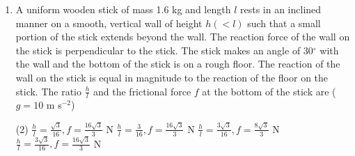
\begin{enumerate}
    \item A uniform wooden stick of mass 1.6 kg and length \( l \) rests in an inclined manner on a smooth, vertical wall of height \( h (< l) \) such that a small portion of the stick extends beyond the wall. The reaction force of the wall on the stick is perpendicular to the stick. The stick makes an angle of 30\(^{\circ}\) with the wall and the bottom of the stick is on a rough floor. The reaction of the wall on the stick is equal in magnitude to the reaction of the floor on the stick. The ratio \( \frac{h}{l} \) and the frictional force \( f \) at the bottom of the stick are (\( g = 10 \) m s\(^{-2}\))
        \begin{tasks}(2)
            \task \( \frac{h}{l} = \frac{\sqrt{3}}{16}, f = \frac{16\sqrt{3}}{3} \) N
            \task \( \frac{h}{l} = \frac{3}{16}, f = \frac{16\sqrt{3}}{3} \) N
            \task \( \frac{h}{l} = \frac{3\sqrt{3}}{16}, f = \frac{8\sqrt{3}}{3} \) N
            \task \( \frac{h}{l} = \frac{3\sqrt{3}}{16}, f = \frac{16\sqrt{3}}{3} \) N
        \end{tasks}
\end{enumerate}

